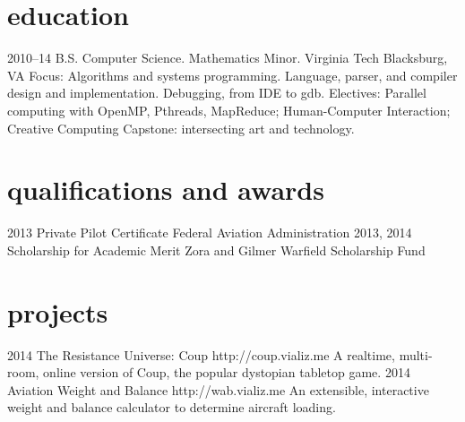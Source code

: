 \documentclass[]{cv-style}          %
\begin{document}

\section{education}

\begin{entrylist}
\entry
{2010--14}
{B.S. Computer Science. Mathematics Minor. {\normalfont Virginia Tech}}
{Blacksburg, VA}
{Focus: Algorithms and systems programming. Language, parser, and compiler design and implementation. Debugging, from IDE to gdb. Electives: Parallel computing with OpenMP, Pthreads, MapReduce; Human-Computer Interaction; Creative Computing Capstone: intersecting art and technology.}
\end{entrylist}


\section{qualifications and awards}
\begin{entrylist}
\entry
{2013}
{Private Pilot Certificate}
{Federal Aviation Administration}
{\vspace{-1.0cm}}
\entry
{2013, 2014}
{Scholarship for Academic Merit}
{Zora and Gilmer Warfield Scholarship Fund}
{\vspace{-1.0cm}}
\end{entrylist}


\section{projects}
\begin{entrylist}
\entry
{2014}
{The Resistance Universe: Coup}
{http://coup.vializ.me}
{A realtime, multi-room, online version of Coup, the popular dystopian tabletop game.}
\entry
{2014}
{Aviation Weight and Balance}
{http://wab.vializ.me}
{An extensible, interactive weight and balance calculator to determine aircraft loading.}


\end{entrylist}
\end{document}
